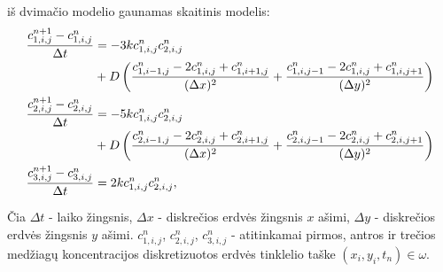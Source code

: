 iš dvimačio modelio gaunamas skaitinis modelis:
\begin{subequations} \label{numerical-eqs}
	\begin{align}
		\frac{c^{n+1}_{1,i,j}-c^n_{1,i,j}}{\Delta t} & =
		-3kc^{n}_{1,i,j}c^{n}_{2,i,j}\notag\\
        & +D\left(\frac{c^n_{1,i-1,j}-2c^n_{1,i,j}+c^n_{1,i+1,j}}{(\Delta x)^2}+\frac{c^n_{1,i,j-1}-2c^n_{1,i,j}+c^n_{1,i,j+1}}{(\Delta y)^2}\right) \\
		\frac{c^{n+1}_{2,i,j}-c^n_{2,i,j}}{\Delta t} & =
		-5kc^{n}_{1,i,j}c^{n}_{2,i,j}\notag\\
        &+D\left(\frac{c^n_{2,i-1,j}-2c^n_{2,i,j}+c^n_{2,i+1,j}}{(\Delta x)^2}+\frac{c^n_{2,i,j-1}-2c^n_{2,i,j}+c^n_{2,i,j+1}}{(\Delta y)^2}\right) \\
		\frac{c^{n+1}_{3,i,j}-c^n_{3,i,j}}{\Delta t} & =2kc^{n}_{1,i,j}c^{n}_{2,i,j},
	\end{align}
\end{subequations}

Čia
$\Delta t$ - laiko žingsnis,
$\Delta x$ - diskrečios erdvės žingsnis $x$ ašimi,
$\Delta y$ - diskrečios erdvės žingsnis $y$ ašimi.
$c^n_{1,i,j}$, $c^n_{2,i,j}$, $c^n_{3,i,j}$ - atitinkamai pirmos, antros ir trečios medžiagų koncentracijos diskretizuotos erdvės tinklelio taške $(x_i, y_i, t_n)\in\omega$.